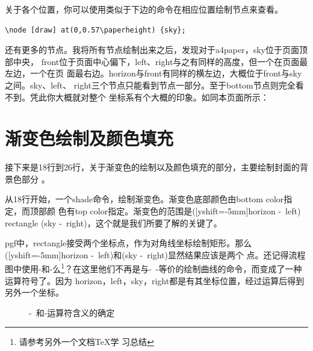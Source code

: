 \documentclass[10pt,a4paper,titlepage]{article}
\begin{document}
关于各个位置，你可以使用类似于下边的命令在相应位置绘制节点来查看。
\begin{Verbatim}
\node [draw] at(0,0.57\paperheight) {sky};
\end{Verbatim}
还有更多的节点。我将所有节点绘制出来之后，发现对于a4paper，sky位于页面顶部中央，
front位于页面中心偏下，left、right与之有同样的高度，但一个在页面最左边，一个在页
面最右边。horizon与front有同样的横左边，大概位于front与sky之间。sky、left、
right三个节点只能看到节点一部分。至于bottom节点则完全看不到。凭此你大概就对整个
坐标系有个大概的印象。如同本页面所示：



\section{渐变色绘制及颜色填充}

接下来是18行到26行，关于渐变色的绘制以及颜色填充的部分，主要绘制封面的背景色部分
。



从18行开始，一个shade命令，绘制渐变色。渐变色底部颜色由bottom color指定，而顶部颜
色有top color指定。渐变色的范围是([yshift=-5mm]horizon -\textbar ~left)
rectangle (sky -\textbar ~right)，这个就是我们所要了解的关键了。

pgf中，rectangle接受两个坐标点，作为对角线坐标绘制矩形。那么
([yshift=-5mm]horizon -\textbar ~left)和(sky -\textbar ~right)显然结果应该是两个
点。还记得流程图中使用-\textbar 和\textbar -么\footnote{请参考另外一个文档TeX学
习总结}？在这里他们不再是与-~-等价的绘制曲线的命令，而变成了一种运算符号了。因为
horizon，left，sky，right都是有其坐标位置，经过运算后得到另外一个坐标。

\begin{figure}[htbp]
\centering
{}
\caption{-\textbar~和\textbar-运算符含义的确定}
\end{figure}
\end{document}
